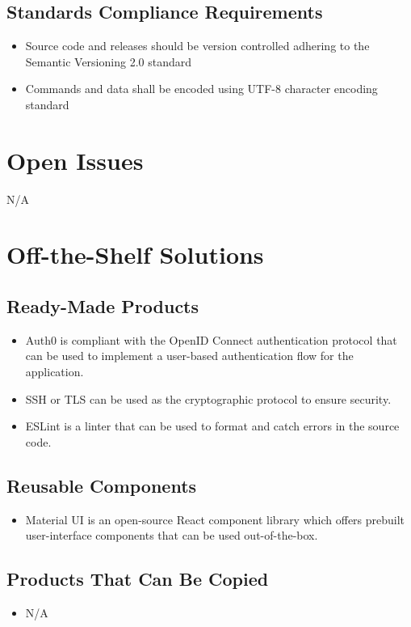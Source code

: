 \documentclass[12pt]{article}
\begin{document}
\subsection{Standards Compliance Requirements}
\begin{itemize}
    \item Source code and releases should be version controlled adhering to the Semantic Versioning 2.0 standard
    \item Commands and data shall be encoded using UTF-8 character encoding standard
\end{itemize}

\section{Open Issues}
N/A

\section{Off-the-Shelf Solutions}
\subsection{Ready-Made Products}
\begin{itemize}
    \item Auth0 is compliant with the OpenID Connect authentication protocol that can be used to implement a user-based authentication flow for the application.
    \item SSH or TLS can be used as the cryptographic protocol to ensure security.
    \item ESLint is a linter that can be used to format and catch errors in the source code.
\end{itemize}

\subsection{Reusable Components}
\begin{itemize}
    \item Material UI is an open-source React component library which offers prebuilt user-interface components that can be used out-of-the-box.
\end{itemize}
\subsection{Products That Can Be Copied}
\begin{itemize}
    \item N/A
\end{itemize}
\end{document}
